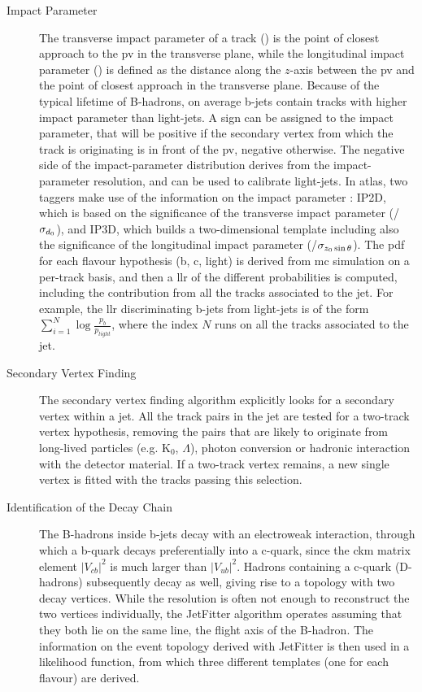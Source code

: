 \begin{description}

\item[Impact Parameter] The transverse impact parameter of a track (\dzero) is the point of closest approach to the 
\gls{pv} in the transverse plane, while the longitudinal impact parameter (\zzerost) is defined as the distance along 
the $z$-axis between the \gls{pv} and the point of closest approach in the transverse plane. Because of the typical 
lifetime of B-hadrons, on average b-jets contain tracks with higher impact parameter than light-jets. 
A sign can be 
assigned to the impact parameter, that will be positive if the secondary vertex from which the track is originating is 
in front of the \gls{pv}, negative otherwise. The negative side of the impact-parameter distribution derives from the 
impact-parameter resolution, and can be used to calibrate light-jets. In \gls{atlas}, two taggers make use of the information on the impact parameter
 \cite{ATLAS:2011qia}: IP2D, which is based on the significance of the transverse impact parameter (\dzero/$\sigma_{{d_0}}$), and IP3D, which builds a two-dimensional template including also the significance of the longitudinal impact parameter (\zzerost/$\sigma_{{z_0} \sin\theta}$). The \gls{pdf} for each flavour hypothesis (b, c, light) is derived from \gls{mc} simulation on a per-track basis, and then a \gls{llr} of the different probabilities is computed, including the contribution from all the tracks associated to the jet. For example, the \gls{llr} discriminating b-jets from light-jets is of the form $\sum_{i=1}^{N}\log\frac{p_b}{p_{light}}$, where the index $N$ runs on all the tracks associated to the jet. 

\item[Secondary Vertex Finding] The secondary vertex finding algorithm \cite{ATLAS:2011qia} explicitly looks for a secondary vertex within a jet. 
All the track pairs in the jet are tested for a two-track vertex hypothesis, removing the pairs that are likely to originate from 
long-lived particles (e.g. K$_0$, $\Lambda$), photon conversion or hadronic interaction with the detector material. 
If a two-track vertex remains, a new single vertex is fitted with the tracks passing this selection.

\item[Identification of the Decay Chain] The B-hadrons inside b-jets decay with an electroweak interaction, 
through which a b-quark decays preferentially into a c-quark, since the \gls{ckm} matrix element $|V_{cb}|^2$ is much larger than $|V_{ub}|^2$. Hadrons containing a c-quark (D-hadrons) subsequently decay as well, giving rise to a topology with two decay vertices. While the resolution is often not enough to reconstruct the two vertices individually, the JetFitter algorithm \cite{1742-6596-119-3-032032} operates assuming that they both lie on the same line, the flight axis of the B-hadron. The information on the event topology derived with JetFitter is then used in a likelihood function, from which three different templates (one for each flavour) are derived.

\end{description}

